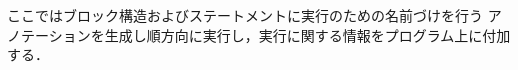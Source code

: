 \documentclass[submit,PRO]{ipsj}
\begin{document}
%
%
%


ここではブロック構造およびステートメントに実行のための名前づけを行う
アノテーションを生成し順方向に実行し，実行に関する情報をプログラム上に付加する．
\end{document}
